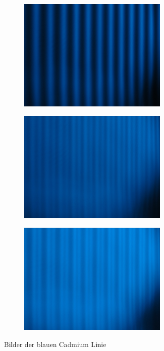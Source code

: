 \begin{figure}
\begin{subfigure}[c]{0.5\textwidth}
\includegraphics[width=0.8\textwidth]{Blau1.JPG}
\label{fig:blau1}
\end{subfigure}
\begin{subfigure}[c]{0.5\textwidth}
\includegraphics[width=0.8\textwidth]{Blau2.JPG}
\label{fig:blau2}
\end{subfigure}
\begin{subfigure}[c]{0.5\textwidth}
\includegraphics[width=0.8\textwidth]{Blau3.JPG}
\label{fig:blau3}
\end{subfigure}
\caption{Bilder der blauen Cadmium Linie}
\end{figure}
